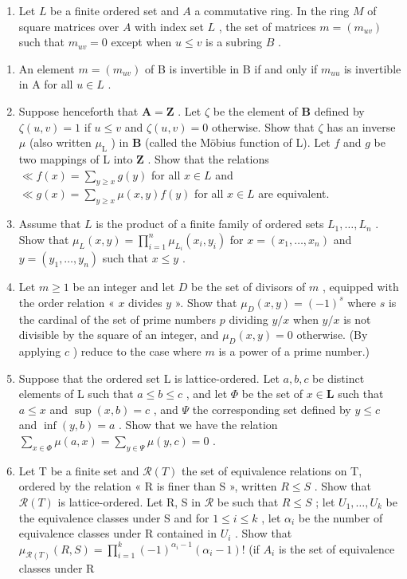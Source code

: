 \begin{enumerate}
\def\labelenumi{\arabic{enumi})}
\setcounter{enumi}{13}
\tightlist
\item
  Let \(L\) be a finite ordered set and \(A\) a commutative ring. In the ring \(M\) of square matrices over \(A\) with index set \(L\) , the set of matrices \(m = (m_{uv})\) such that \(m_{uv} = 0\) except when \(u \leqslant v\) is a subring \(B\) .
\end{enumerate}

\begin{enumerate}
\def\labelenumi{\alph{enumi})}
\item
  An element \(m = (m_{uv})\) of B is invertible in B if and only if \(m_{uu}\) is invertible in A for all \(u \in L\) .
\item
  Suppose henceforth that \(\mathbf{A} = \mathbf{Z}\) . Let \(\zeta\) be the element of \(\mathbf{B}\) defined by \(\zeta(u, v) = 1\) if \(u \leqslant v\) and \(\zeta(u, v) = 0\) otherwise. Show that \(\zeta\) has an inverse \(\mu\) (also written \(\mu_{\mathrm{L}}\) ) in \(\mathbf{B}\) (called the Möbius function of L). Let \(f\) and \(g\) be two mappings of L into \(\mathbf{Z}\) . Show that the relations \(\ll f(x) = \sum_{y \geqslant x} g(y)\) for all \(x \in L\) and \(\ll g(x) = \sum_{y \geqslant x} \mu(x, y) f(y)\) for all \(x \in L\) are equivalent.
\item
  Assume that \(L\) is the product of a finite family of ordered sets \(L_1, \ldots, L_n\) . Show that \(\mu_L(x, y) = \prod_{i=1}^{n} \mu_{L_i}(x_i, y_i)\) for \(x = (x_1, \ldots, x_n)\) and \(y = (y_1, \ldots, y_n)\) such that \(x \leqslant y\) .
\item
  Let \(m \geqslant 1\) be an integer and let \(D\) be the set of divisors of \(m\) , equipped with the order relation « \(x\) divides \(y\) ». Show that \(\mu_{D}(x, y) = (-1)^{s}\) where \(s\) is the cardinal of the set of prime numbers \(p\) dividing \(y/x\) when \(y/x\) is not divisible by the square of an integer, and \(\mu_{D}(x, y) = 0\) otherwise. (By applying \(c\) ) reduce to the case where \(m\) is a power of a prime number.)
\item
  Suppose that the ordered set L is lattice-ordered. Let \(a, b, c\) be distinct elements of L such that \(a \leqslant b \leqslant c\) , and let \(\Phi\) be the set of \(x \in \mathbf{L}\) such that \(a \leqslant x\) and \(\sup(x, b) = c\) , and \(\Psi\) the corresponding set defined by \(y \leqslant c\) and \(\inf(y, b) = a\) . Show that we have the relation \(\sum_{x \in \Phi} \mu(a, x) = \sum_{y \in \Psi} \mu(y, c) = 0\) .
\item
  Let T be a finite set and \(\mathcal{R}(T)\) the set of equivalence relations on T, ordered by the relation « R is finer than S », written \(R \leqslant S\) . Show that \(\mathcal{R}(T)\) is lattice-ordered. Let R, S in \(\mathcal{R}\) be such that \(R \leqslant S\) ; let \(U_1, \ldots, U_k\) be the equivalence classes under S and for \(1 \leqslant i \leqslant k\) , let \(\alpha_i\) be the number of equivalence classes under R contained in \(U_i\) . Show that \(\mu_{\mathcal{R}(T)}(R, S) = \prod_{i=1}^{k} (-1)^{\alpha_i - 1} (\alpha_i - 1)!\) (if \(A_i\) is the set of equivalence classes under R
\end{enumerate}

